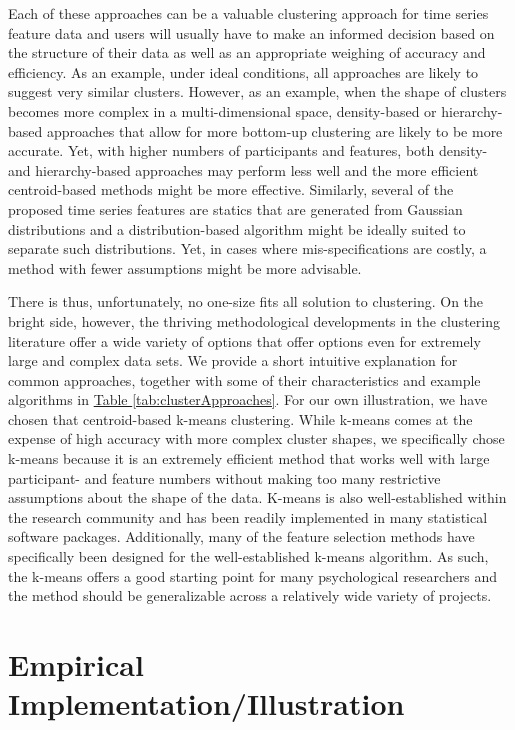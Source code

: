\documentclass[man, 12pt, a4paper]{apa7}
\theoremstyle{break}
\theoremstyle{plain}
\newcommand{\tblref}[2][]{\hyperref[#2]{Table \ref*{#2}#1}}
\begin{document}
Each of these approaches can be a valuable clustering approach for time series feature data and users will usually have to make an informed decision based on the structure of their data as well as an appropriate weighing of accuracy and efficiency. As an example, under ideal conditions, all approaches are likely to suggest very similar clusters. However, as an example, when the shape of clusters becomes more complex in a multi-dimensional space, density-based or hierarchy-based approaches that allow for more bottom-up clustering are likely to be more accurate. Yet, with higher numbers of participants and features, both density- and hierarchy-based approaches may perform less well and the more efficient centroid-based methods might be more effective. Similarly, several of the proposed time series features are statics that are generated from Gaussian distributions and a distribution-based algorithm might be ideally suited to separate such distributions. Yet, in cases where mis-specifications are costly, a method with fewer assumptions might be more advisable. 

There is thus, unfortunately, no one-size fits all solution to clustering. On the bright side, however, the thriving methodological developments in the clustering literature offer a wide variety of options that offer options even for extremely large and complex data sets. We provide a short intuitive explanation for common approaches, together with some of their characteristics and example algorithms in \tblref{tab:clusterApproaches}. For our own illustration, we have chosen that centroid-based k-means clustering. While k-means comes at the expense of high accuracy with more complex cluster shapes, we specifically chose k-means because it is an extremely efficient method that works well with large participant- and feature numbers without making too many restrictive assumptions about the shape of the data. K-means is also well-established within the research community and has been readily implemented in many statistical software packages. Additionally, many of the feature selection methods have specifically been designed for the well-established k-means algorithm. As such, the k-means offers a good starting point for many psychological researchers and the method should be generalizable across a relatively wide variety of projects.



\section{Empirical Implementation/Illustration}

\end{document}
